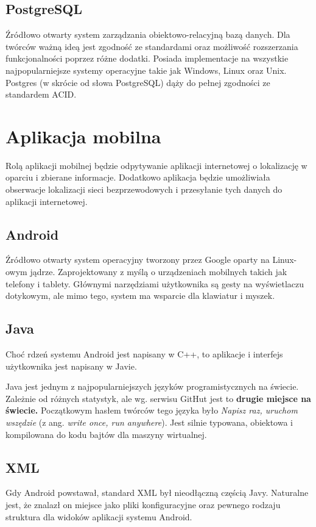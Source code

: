 \subsection{PostgreSQL}
Źródłowo otwarty system zarządzania obiektowo-relacyjną bazą danych. Dla twórców ważną ideą jest zgodność ze standardami oraz możliwość rozszerzania funkcjonalności poprzez różne dodatki. Posiada implementacje na wszystkie najpopularniejsze systemy operacyjne takie jak Windows, Linux oraz Unix. Postgres (w skrócie od słowa PostgreSQL) dąży do pełnej zgodności ze standardem ACID.\cite{PostgresWiki}

\section{Aplikacja mobilna}
Rolą aplikacji mobilnej będzie odpytywanie aplikacji internetowej o lokalizację w oparciu i zbierane informacje. Dodatkowo aplikacja będzie umożliwiała obserwacje lokalizacji sieci bezprzewodowych i przesyłanie tych danych do aplikacji internetowej.

\subsection{Android}
Źródłowo otwarty system operacyjny tworzony przez Google oparty na Linux-owym jądrze. Zaprojektowany z myślą o urządzeniach mobilnych takich jak telefony i tablety. Głównymi narzędziami użytkownika są gesty na wyświetlaczu dotykowym, ale mimo tego, system ma wsparcie dla klawiatur i myszek.\cite{AndroidWiki}

\subsection{Java}
Choć rdzeń systemu Android jest napisany w C++, to aplikacje i interfejs użytkownika jest napisany w Javie.\cite{AndroidWiki}

Java jest jednym z najpopularniejszych języków programistycznych na świecie. Zależnie od różnych statystyk, ale wg. serwisu GitHut jest to \textbf{drugie miejsce na świecie.}\cite{GithutStats2017} Początkowym hasłem twórców tego języka było \textit{Napisz raz, uruchom wszędzie} (z ang. \textit{write once, run anywhere}). Jest silnie typowana, obiektowa i kompilowana do kodu bajtów dla maszyny wirtualnej.\cite{JavaWiki}

\subsection{XML}
Gdy Android powstawał, standard XML był nieodłączną częścią Javy. Naturalne jest, że znalazł on miejsce jako pliki konfiguracyjne oraz pewnego rodzaju struktura dla widoków aplikacji systemu Android.


